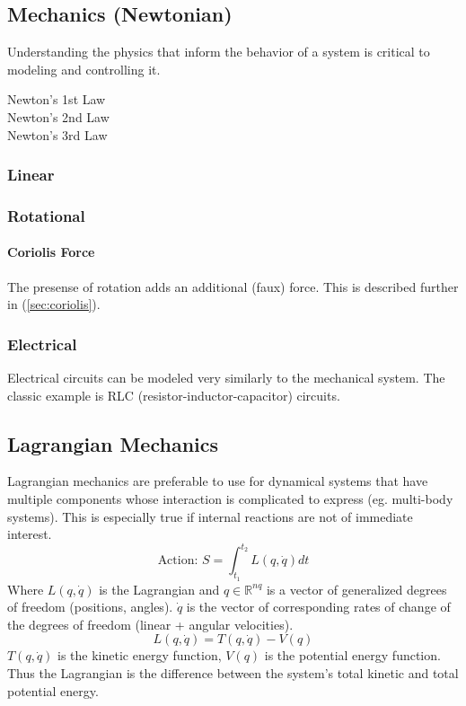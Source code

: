 \documentclass[../notes.tex]{subfiles}
\begin{document}
\subsection{Mechanics (Newtonian)}
Understanding the physics that inform the behavior of a system is critical to modeling and controlling it.
\begin{description}
    \item[Newton's 1st Law]
    \item[Newton's 2nd Law]
    \item[Newton's 3rd Law]  
\end{description}
\subsubsection{Linear}
\subsubsection{Rotational}
\paragraph{Coriolis Force}
The presense of rotation adds an additional (faux) force. This is described further in (\underline{\ref{sec:coriolis}}).
\subsubsection{Electrical}
Electrical circuits can be modeled very similarly to the mechanical system. The classic example is RLC (resistor-inductor-capacitor) circuits.


\subsection{Lagrangian Mechanics}
Lagrangian mechanics are preferable to use for dynamical systems that have multiple components whose interaction is complicated to express (eg. multi-body systems). This is especially true if internal reactions are not of immediate interest.
\begin{equation} \label{eq:lagrangian}
    \text{Action: } S = \int_{t_1}^{t_2} L(q, \dot{q})dt
\end{equation}
Where $L(q, \dot{q})$ is the Lagrangian and $q\in \mathbb{R}^{nq}$ is a vector of generalized degrees of freedom (positions, angles). $\dot{q}$ is the vector of corresponding rates of change of the degrees of freedom (linear + angular velocities).
\begin{equation}
    L(q, \dot{q}) = T(q, \dot{q}) - V(q)
\end{equation}
$T(q, \dot{q})$ is the kinetic energy function, $V(q)$ is the potential energy function. Thus the Lagrangian is the difference between the system's total kinetic and total potential energy.
\end{document}
